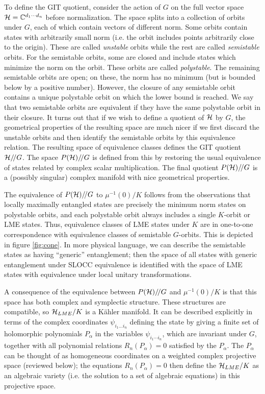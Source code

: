 \documentclass[12pt]{article}
\theoremstyle{definition}
\newcommand{\GITquot}{/\!/}
\begin{document}
To define the GIT quotient, consider the action of $G$ on the full vector space ${\cal H} = \mathbb{C}^{d_1 \cdots d_n}$ before normalization. The space splits into a collection of orbits under $G$, each of which contain vectors of different norm. Some orbits contain states with arbitrarily small norm (i.e. the orbit includes points arbitrarily close to the origin). These are called {\it unstable} orbits while the rest are called {\it semistable} orbits. For the semistable orbits, some are closed and include states which minimize the norm on the orbit. These orbits are called {\it polystable}. The remaining semistable orbits are open; on these, the norm has no minimum (but is bounded below by a positive number). However, the closure of any semistable orbit contains a unique polystable orbit on which the lower bound is reached. We say that two semistable orbits are equivalent if they have the same polystable orbit in their closure. It turns out that if we wish to define a quotient of ${\cal H}$ by $G$, the geometrical properties of the resulting space are much nicer if we first discard the unstable orbits and then identify the semistable orbits by this equivalence relation. The resulting space of equivalence classes defines the GIT quotient ${\cal H}\GITquot G$. The space $P({\cal H})\GITquot G$ is defined from this by restoring the usual equivalence of states related by complex scalar multiplication. The final quotient $P({\cal H})\GITquot G$ is a (possibly singular) complex manifold with nice geometrical properties.

The equivalence of $P({\cal H})\GITquot G$ to $\mu^{-1}(0)/K$ follows from the observations that locally maximally entangled states are precisely the minimum norm states on polystable orbits, and each polystable orbit always includes a single $K$-orbit or LME states. Thus, equivalence classes of LME states under $K$ are in one-to-one correspondence with equivalence classes of semistable $G$-orbits. This is depicted in figure \ref{fig:cone}. In more physical language, we can describe the semistable states as having ``generic'' entanglement; then the space of all states with generic entanglement under SLOCC equivalence is identified with the space of LME states with equivalence under local unitary transformations.

A consequence of the equivalence between $P({\cal H})\GITquot G$ and
$\mu^{-1}(0)/K$ is that this space has both complex and symplectic
structure. These structures are compatible, so ${\cal H}_{LME}/K$ is a
K\"ahler manifold. It can be described explicitly in terms of the
complex coordinates $\psi_{i_1 \dots i_n}$ defining the state by
giving a finite set of holomorphic polynomials $P_{\alpha }$ in the
variables $\psi_{i_{1}\dotsb i_{n}}$, which are invariant under $G$,
together with all polynomial relations $R_n(P_\alpha ) = 0$ satisfied
by the $P_{\alpha }$. The $P_\alpha $ can be thought of as homogeneous
coordinates on a weighted complex projective space (reviewed below); the equations
$R_n(P_\alpha ) = 0$ then define the ${\cal H}_{LME}/K$ as an
algebraic variety (i.e. the solution to a set of algebraic equations)
in this projective space.
\end{document}
